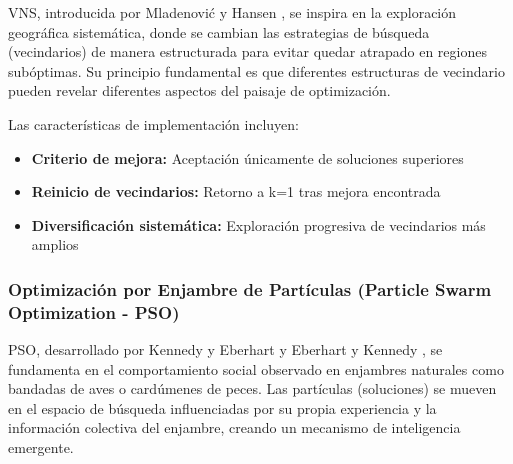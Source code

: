 VNS, introducida por Mladenović y Hansen \cite{mladenovic1997variable}, se inspira en la exploración geográfica sistemática, donde se cambian las estrategias de búsqueda (vecindarios) de manera estructurada para evitar quedar atrapado en regiones subóptimas. Su principio fundamental es que diferentes estructuras de vecindario pueden revelar diferentes aspectos del paisaje de optimización.

\begin{table}[htbp]
\centering
{}
\caption{Configuración de parámetros del algoritmo VNS.}
\label{tab:parametros_vns}
\end{table}

Las características de implementación incluyen:
\begin{itemize}
    \item \textbf{Criterio de mejora:} Aceptación únicamente de soluciones superiores
    \item \textbf{Reinicio de vecindarios:} Retorno a k=1 tras mejora encontrada
    \item \textbf{Diversificación sistemática:} Exploración progresiva de vecindarios más amplios
\end{itemize}

\subsubsection{Optimización por Enjambre de Partículas (Particle Swarm Optimization - PSO)}

PSO, desarrollado por Kennedy y Eberhart \cite{kennedy1995particle} y Eberhart y Kennedy \cite{eberhart1995particle}, se fundamenta en el comportamiento social observado en enjambres naturales como bandadas de aves o cardúmenes de peces. Las partículas (soluciones) se mueven en el espacio de búsqueda influenciadas por su propia experiencia y la información colectiva del enjambre, creando un mecanismo de inteligencia emergente.


